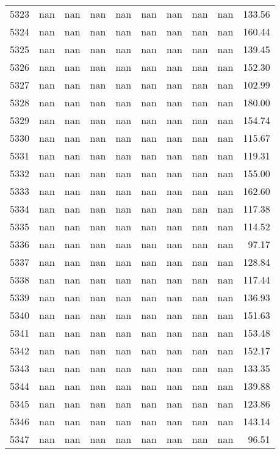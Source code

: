 \begin{tabular}{lrrrrrrrrr}
5323 & nan & nan & nan & nan & nan & nan & nan & nan & 133.56 \\
5324 & nan & nan & nan & nan & nan & nan & nan & nan & 160.44 \\
5325 & nan & nan & nan & nan & nan & nan & nan & nan & 139.45 \\
5326 & nan & nan & nan & nan & nan & nan & nan & nan & 152.30 \\
5327 & nan & nan & nan & nan & nan & nan & nan & nan & 102.99 \\
5328 & nan & nan & nan & nan & nan & nan & nan & nan & 180.00 \\
5329 & nan & nan & nan & nan & nan & nan & nan & nan & 154.74 \\
5330 & nan & nan & nan & nan & nan & nan & nan & nan & 115.67 \\
5331 & nan & nan & nan & nan & nan & nan & nan & nan & 119.31 \\
5332 & nan & nan & nan & nan & nan & nan & nan & nan & 155.00 \\
5333 & nan & nan & nan & nan & nan & nan & nan & nan & 162.60 \\
5334 & nan & nan & nan & nan & nan & nan & nan & nan & 117.38 \\
5335 & nan & nan & nan & nan & nan & nan & nan & nan & 114.52 \\
5336 & nan & nan & nan & nan & nan & nan & nan & nan & 97.17 \\
5337 & nan & nan & nan & nan & nan & nan & nan & nan & 128.84 \\
5338 & nan & nan & nan & nan & nan & nan & nan & nan & 117.44 \\
5339 & nan & nan & nan & nan & nan & nan & nan & nan & 136.93 \\
5340 & nan & nan & nan & nan & nan & nan & nan & nan & 151.63 \\
5341 & nan & nan & nan & nan & nan & nan & nan & nan & 153.48 \\
5342 & nan & nan & nan & nan & nan & nan & nan & nan & 152.17 \\
5343 & nan & nan & nan & nan & nan & nan & nan & nan & 133.35 \\
5344 & nan & nan & nan & nan & nan & nan & nan & nan & 139.88 \\
5345 & nan & nan & nan & nan & nan & nan & nan & nan & 123.86 \\
5346 & nan & nan & nan & nan & nan & nan & nan & nan & 143.14 \\
5347 & nan & nan & nan & nan & nan & nan & nan & nan & 96.51 \\

\end{tabular}

